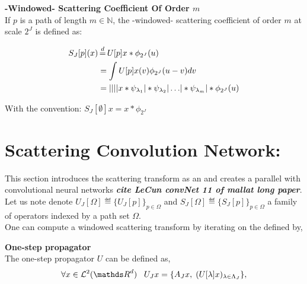 \documentclass[a4paper,11pt]{report}
\begin{document}
{      \begin{defn} \textbf{-Windowed- Scattering Coefficient Of Order $m$}\\
				If $p$ is a path of length $m \in \mathds{N}$, the -windowed- scattering coefficient of order $m$ at scale $2^{J}$ is defined as:
				
				\begin{equation}
					\label{eq:ST windowed}
					\begin{split}
						S_{J}[p](x) &\eqdef U[p]x \ast \phi_{2^{J}}(u) \\
									&= \int U[p]x(v) \phi_{2^{J}}(u-v) dv \\
									&= \abs{\abs{\abs{\abs{x \ast \psi_{\lambda_{1}}} \ast \psi_{\lambda_{2}}} 
							\dots } \ast \psi_{\lambda_{m}}} \ast \phi_{2^{J}}(u)
					\end{split}
				\end{equation}
				
				With the convention: $S_{J}[\emptyset]x = x \ast \phi_{2^{J}}$\\
      	\label{def:SC windozed}
      \end{defn}


		\section{Scattering Convolution Network:}
			\label{sec:ST/SCN}
			
			This section introduces the scattering transform as an  and creates a parallel with convolutional neural networks \textbf{\textit{cite LeCun convNet 11 of mallat long paper}}. Let us note denote $U_{J}[\Omega] \eqdef \{U_{J}[p]\}_{p \in \Omega}$ and $S_{J}[\Omega] \eqdef \{S_{J}[p]\}_{p \in \Omega}$ a family of operators indexed by a path set $\Omega$.\\
			
			One can compute a windowed scattering transform by iterating on the  defined by,
			
			\begin{defn}  \textbf{One-step propagator}\\
				The one-step propagator $U$ can be defined as,
				\begin{equation}
					\forall x \in \mathcal{L}^{2}(\dsR^{d}) \;\;\; U_{J} x = \{ A_{J}x , \; (U[\lambda]x)_{\lambda \in \Lambda_{J}} \},
					\label{eq:One step propagator}
				\end{equation}
				

\end{defn}}
\end{document}

